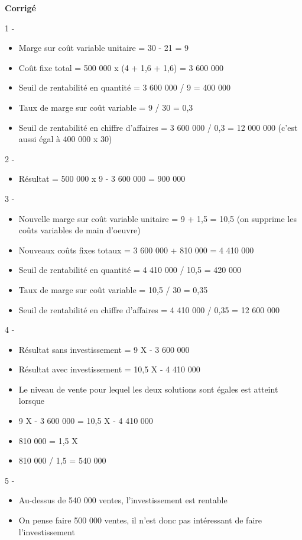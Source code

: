 \documentclass[oneside]{kaobook}
\begin{document}
\textbf{Corrigé}

1 -
\begin{itemize}
\item Marge sur coût variable unitaire = 30 - 21 = 9
\item Coût fixe total = 500 000 x (4 + 1,6 + 1,6) = 3 600 000
\item Seuil de rentabilité en quantité = 3 600 000 / 9 = 400 000
\item Taux de marge sur coût variable = 9 / 30 = 0,3
\item Seuil de rentabilité en chiffre d'affaires = 3 600 000 / 0,3 = 12 000 000 (c'est aussi égal à 400 000 x 30)
\end{itemize}

2 -
\begin{itemize}
\item Résultat = 500 000 x 9 - 3 600 000 = 900 000
\end{itemize}

3 -
\begin{itemize}
\item Nouvelle marge sur coût variable unitaire = 9 + 1,5 = 10,5 (on supprime les coûts variables de main d'oeuvre)
\item Nouveaux coûts fixes totaux = 3 600 000 + 810 000 = 4 410 000
\item Seuil de rentabilité en quantité = 4 410 000 / 10,5 = 420 000
\item Taux de marge sur coût variable = 10,5 / 30 = 0,35
\item Seuil de rentabilité en chiffre d'affaires = 4 410 000 / 0,35 = 12 600 000
\end{itemize}

4 -
\begin{itemize}
\item Résultat sans investissement  = 9 X - 3 600 000
\item Résultat avec investissement = 10,5 X - 4 410 000
\item Le niveau de vente pour lequel les deux solutions sont égales est atteint lorsque
\item 9 X - 3 600 000 = 10,5 X - 4 410 000
\item <--> 810 000 = 1,5 X
\item <--> 810 000 / 1,5 = 540 000
\end{itemize}
5 -
\begin{itemize}
\item Au-dessus de 540 000 ventes, l'investissement est rentable
\item On pense faire 500 000 ventes, il n'est donc pas intéressant de faire l'investissement
\end{itemize}
\end{document}
